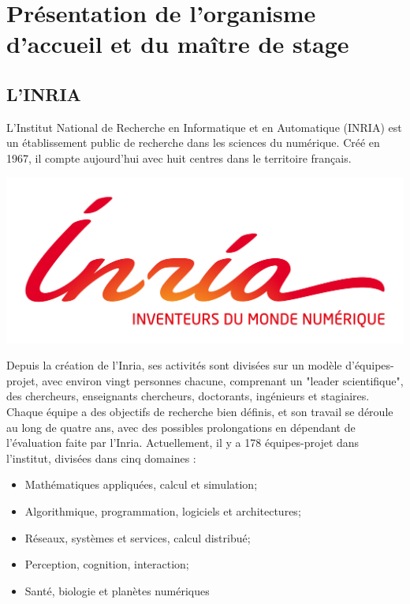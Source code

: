 \section{Présentation de l'organisme d'accueil et du maître de stage}
\label{sec:organisme}

\subsection{L'INRIA}
\label{subsec:inria}

\indent L'Institut National de Recherche en Informatique et en Automatique (INRIA) est un établissement public de recherche dans les sciences du numérique. Créé en 1967, il compte aujourd'hui avec huit centres dans le territoire français. 

\begingroup
\centering
\includegraphics[scale=.3]{figures/logos/Inria.jpg}
\endgroup

\indent Depuis la création de l'Inria, ses activités sont divisées sur un modèle d'équipes-projet, avec environ vingt personnes chacune, comprenant un "leader scientifique", des chercheurs, enseignants chercheurs, doctorants, ingénieurs et stagiaires. Chaque équipe a des objectifs de recherche bien définis, et son travail se déroule au long de quatre ans, avec des possibles prolongations en dépendant de l'évaluation faite par l'Inria. Actuellement, il y a 178 équipes-projet dans l'institut, divisées dans cinq domaines : 

\begin{itemize}
	\item Mathématiques appliquées, calcul et simulation;
	\item Algorithmique, programmation, logiciels et architectures;
	\item Réseaux, systèmes et services, calcul distribué;
	\item Perception, cognition, interaction;
	\item Santé, biologie et planètes numériques
\end{itemize}

